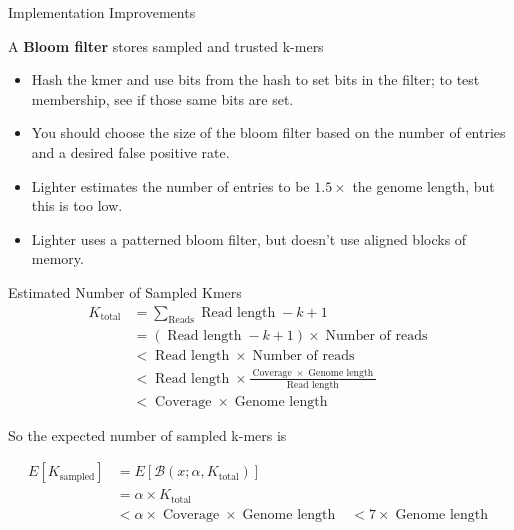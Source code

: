 \documentclass[table]{beamer}
\begin{document}
\begin{frame}{Implementation Improvements}

\begin{block}{A \textbf{Bloom filter} stores sampled and trusted k-mers}
\begin{itemize}
\item Hash the kmer and use bits from the hash to set bits in the filter; to test membership, see if those same bits are set.
\item You should choose the size of the bloom filter based on the number of entries and a desired false positive rate.
\end{itemize}
\end{block}

\begin{itemize}
\item Lighter estimates the number of entries to be $1.5\times$ the genome length, but this is too low.
\item Lighter uses a patterned bloom filter, but doesn't use aligned blocks of memory.
\end{itemize}
\end{frame}

\begin{frame}{Estimated Number of Sampled Kmers}
\begin{align}
K_{\operatorname{total}} &= \sum_{\operatorname{Reads}}{\operatorname{Read\:length} - k + 1} \\
&= (\operatorname{Read\:length} - k + 1) \times \operatorname{Number\:of\:reads} \\
&< \operatorname{Read\:length} \times \operatorname{Number\:of\:reads} \\
&< \operatorname{Read\:length} \times \frac{\operatorname{Coverage} \times \operatorname{Genome\:length}}{\operatorname{Read\:length}} \\
&< \operatorname{Coverage} \times \operatorname{Genome\:length}
\end{align}

So the expected number of sampled k-mers is

\begin{align}
E[K_{\operatorname{sampled}}] &= E[\mathcal{B}(x; \alpha, K_{\operatorname{total}})] \\
&= \alpha \times K_{\operatorname{total}} \\
&< \alpha \times \operatorname{Coverage} \times \operatorname{Genome\:length}
&< 7 \times \operatorname{Genome\:length}
\end{align}
\end{frame}
\end{document}
